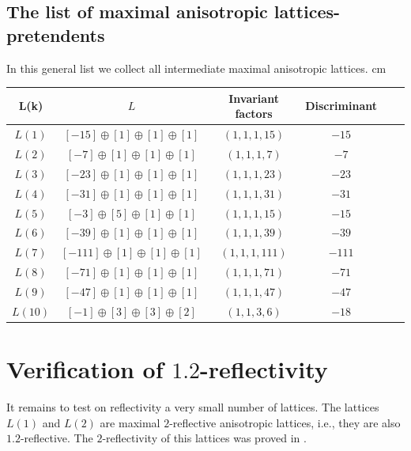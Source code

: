 \documentclass[14pt]{article}
\begin{document}
\subsection{The list of maximal anisotropic lattices-pretendents}\label{sp-prom-pretend}

\begin{small}
In this general list we collect all intermediate maximal anisotropic lattices.
 cm

\begin{tabular}{|c|c|c|c|c|c|}
\hline
L(k) & $L$ & Invariant factors & Discriminant\\
\hline
$L(1)$ & $[-15] \oplus [1] \oplus [1] \oplus [1]$
& $(1, 1, 1, 15)$ & $-15$ \\
\hline
$L(2)$ & $[-7] \oplus [1] \oplus [1] \oplus [1]$ & $(1, 1, 1, 7)$ & $-7$ \\
\hline
$L(3)$ & $[-23] \oplus [1] \oplus [1] \oplus [1]$ & $(1, 1, 1, 23)$ & $-23$ \\
\hline
$L(4)$ & $[-31] \oplus [1] \oplus [1] \oplus [1]$ & $(1, 1, 1, 31)$ & $-31$ \\
\hline
$L(5)$ & $[-3] \oplus [5] \oplus [1] \oplus [1]$ & $(1, 1, 1, 15)$ & $-15$ \\
\hline
$L(6)$ & $[-39] \oplus [1] \oplus [1] \oplus [1]$ & $(1, 1, 1, 39)$ & $-39$ \\
\hline
$L(7)$ & $[-111] \oplus [1] \oplus [1] \oplus [1]$
& $(1, 1, 1, 111)$ & $-111$ \\
\hline
$L(8)$ & $[-71] \oplus [1] \oplus [1] \oplus [1]$ & $(1, 1, 1, 71)$ & $-71$ \\
\hline
$L(9)$ & $[-47] \oplus [1] \oplus [1] \oplus [1]$ & $(1, 1, 1, 47)$ & $-47$ \\
\hline
$L(10)$ & $[-1] \oplus [3] \oplus [3] \oplus [2]$ & $(1, 1, 3, 6)$ & $-18$ \\
\hline

\end{tabular}
\end{small}

\section{Verification of $1.2$-reflectivity}\label{issled-refl}

It remains to test on reflectivity a very small number of lattices.
The lattices $L(1)$ and $L(2)$ are maximal $2$-reflective
anisotropic lattices, i.e., they are also $1.2$-reflective.
The $2$-reflectivity of this lattices
was proved in \cite{vinberg07classhyplat}.
\end{document}

